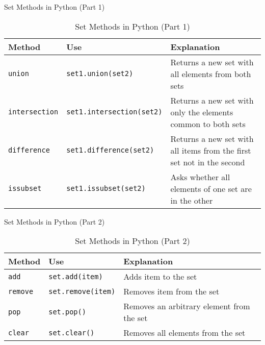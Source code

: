 \begin{frame}{Set Methods in Python (Part 1)}
    \begin{table}[]
        \centering
        \begin{tabular}{|l|l|p{3.8cm}|}
            \hline
            \textbf{Method} & \textbf{Use} & \textbf{Explanation} \\ \hline
            \texttt{union} & \texttt{set1.union(set2)} & Returns a new set with all elements from both sets \\ \hline
            \texttt{intersection} & \texttt{set1.intersection(set2)} & Returns a new set with only the elements common to both sets \\ \hline
            \texttt{difference} & \texttt{set1.difference(set2)} & Returns a new set with all items from the first set not in the second \\ \hline
            \texttt{issubset} & \texttt{set1.issubset(set2)} & Asks whether all elements of one set are in the other \\ \hline
        \end{tabular}
        \caption{Set Methods in Python (Part 1)}
    \end{table}
\end{frame}

\begin{frame}{Set Methods in Python (Part 2)}
    \begin{table}[]
        \centering
        \begin{tabular}{|l|l|p{5cm}|}
            \hline
            \textbf{Method} & \textbf{Use} & \textbf{Explanation} \\ \hline
            \texttt{add} & \texttt{set.add(item)} & Adds item to the set \\ \hline
            \texttt{remove} & \texttt{set.remove(item)} & Removes item from the set \\ \hline
            \texttt{pop} & \texttt{set.pop()} & Removes an arbitrary element from the set \\ \hline
            \texttt{clear} & \texttt{set.clear()} & Removes all elements from the set \\ \hline
        \end{tabular}
        \caption{Set Methods in Python (Part 2)}
    \end{table}
\end{frame}

